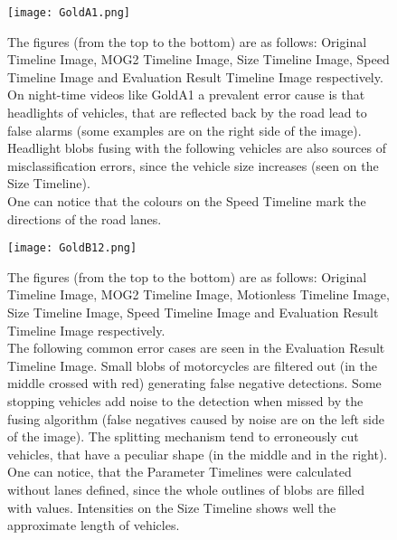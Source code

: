 \vspace{1cm}
\centering
\begin{figure}[h!]
	\centering
	\captionsetup{width=0.9\textwidth,aboveskip=10pt}
	\texttt{[image: GoldA1.png]}
	\caption[Some output Timelines of the GoldA1 test video]{The figures (from the top to the bottom) are as follows: Original Timeline Image, MOG2 Timeline Image, Size Timeline Image, Speed Timeline Image and Evaluation Result Timeline Image respectively. \\
	On night-time videos like GoldA1 a prevalent error cause is that headlights of vehicles, that are reflected back by the road lead to false alarms (some examples are on the right side of the image). Headlight blobs fusing with the following vehicles are also sources of misclassification errors, since the vehicle size increases (seen on the Size Timeline). \\
	One can notice that the colours on the Speed Timeline  mark the directions of the road lanes. \label{fig:GoldA1}}
\end{figure}

\centering
\begin{figure}[h!]
	\centering
	\captionsetup{width=0.9\textwidth,aboveskip=10pt}
	\texttt{[image: GoldB12.png]}
	\caption[Some output Timelines of the GoldB1 test video]{The figures (from the top to the bottom) are as follows: Original Timeline Image, MOG2 Timeline Image, Motionless Timeline Image, Size Timeline Image, Speed Timeline Image and Evaluation Result Timeline Image respectively.\\
	 The following common error cases are seen in the Evaluation Result Timeline Image. Small blobs of motorcycles are filtered out (in the middle crossed with red) generating false negative detections. Some stopping vehicles add noise to the detection when missed by the fusing algorithm (false negatives caused by noise are on the left side of the image). The splitting mechanism tend to erroneously cut vehicles, that have a peculiar shape (in the middle and in the right). \\
	 One can notice, that the Parameter Timelines were calculated without lanes defined, since the whole outlines of blobs are filled with values. Intensities on the Size Timeline shows well the approximate length of vehicles. \label{fig:GoldB1}}
\end{figure}

